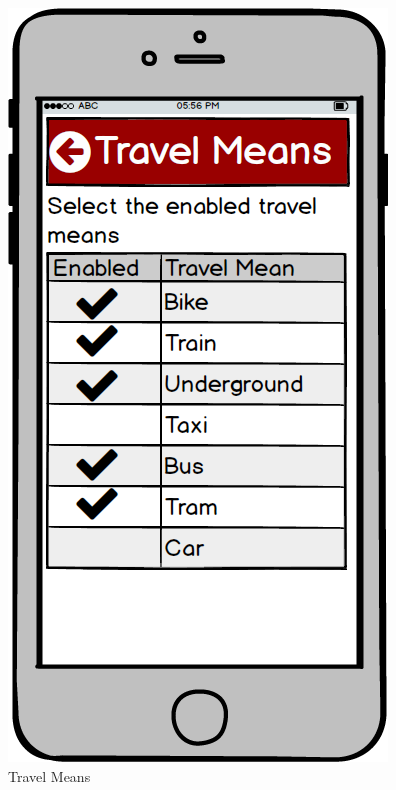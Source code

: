 \begin{figure}[!htb]
\begin{minipage}[b]{0.3\textwidth}
	\includegraphics[scale=0.3]{images/TravelMeans}
	\caption{Travel Means}
	\label{ref:travelMeans}
\end{minipage}
\end{figure}